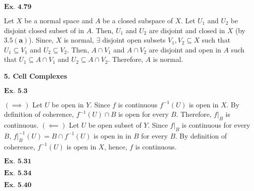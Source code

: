 \documentclass{article}
\begin{document}
\vspace{0.2in}

${\textbf{Ex. 4.79}}$

Let $X$ be a normal space and $A$ be a closed subspace of $X$. Let $U_1$ and $U_2$ be disjoint closed subset of in $A$. Then, $U_1$ and $U_2$ are disjoint and closed in $X$ (by $\mathbf{3.5(a)}$). Since, $X$ is normal, $\exists$ disjoint open subsets $V_1,V_2\subseteq X$ such that $U_1 \subseteq V_1$ and $U_2 \subseteq V_2$. Then, $A \cap V_1$ and $A \cap V_2$ are disjoint and open in $A$ such that $U_1 \subseteq A \cap V_1$ and $U_2 \subseteq A \cap V_2$. Therefore, $A$ is normal.

\vspace{0.2in}



\clearpage

\begin{center}
    \textbf{\large{5. Cell Complexes}}
\end{center}

${\textbf{Ex. 5.3}}$

$(\implies)$ Let $U$ be open in $Y$. Since $f$ is continuous $f^{-1}(U)$ is open in $X$. By definition of coherence, $f^{-1}(U) \cap B$ is open for every $B$. Therefore, $f\big\vert_{B}$ is continuous. $(\impliedby)$ Let $U$ be open subset of $Y$. Since $f\big\vert_{B}$ is continuous for every $B$, $f\big\vert_{B}^{-1}(U) = B \cap f^{-1}(U)$ is open in in $B$ for every $B$. By definition of coherence, $f^{-1}(U)$ is open in $X$, hence, $f$ is continuous. 

\vspace{0.2in}
${\textbf{Ex. 5.31}}$

\vspace{0.2in}
${\textbf{Ex. 5.34}}$

\vspace{0.2in}
${\textbf{Ex. 5.40}}$

\vspace{0.2in}
\end{document}

